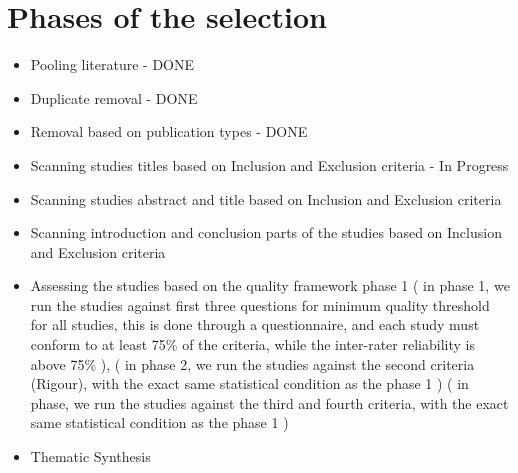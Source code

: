 \documentclass{article}
\theoremstyle{mytheoremstyle}
\theoremstyle{mytheoremstyle}
\theoremstyle{myproblemstyle}
\begin{document}
      \section{Phases of the selection}

      \begin{itemize}
        \item Pooling literature - DONE 
        \item Duplicate removal - DONE 
        \item Removal based on publication types - DONE 
        \item Scanning studies titles based on Inclusion and Exclusion criteria - In Progress
        \item Scanning studies abstract and title based on Inclusion and Exclusion criteria 
        \item Scanning introduction and conclusion parts of the studies based on Inclusion and Exclusion criteria
        \item Assessing the studies based on the quality framework phase 1 ( in phase 1, we run the studies against first three questions for minimum quality threshold for all studies, this is done through a questionnaire, and each study must conform to at least 75\% of the criteria, while the inter-rater reliability is above 75\% ), ( in phase 2, we run the studies against the second criteria (Rigour), with the exact same statistical condition as the phase 1 ) ( in phase, we run the studies against the third and fourth criteria, with the exact same statistical condition as the phase 1 )
        \item Thematic Synthesis
      \end{itemize}
\end{document}
